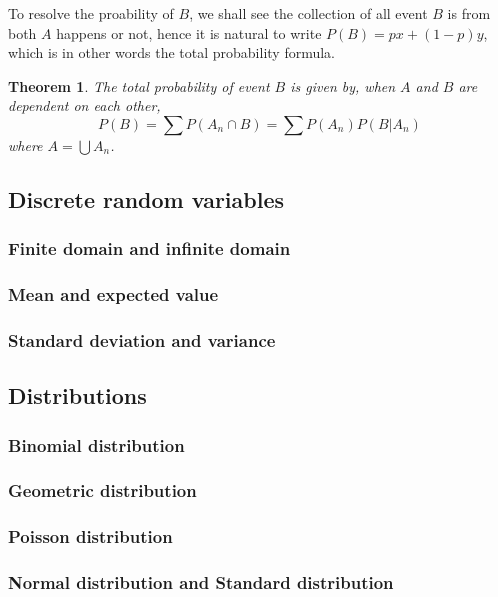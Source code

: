 \documentclass[12pt]{article}
\newtheorem*{theorem}{Theorem}
\begin{document}
    To resolve the proability of $B$, we shall see the collection of all event $B$ is from both $A$ happens or not, hence it is natural to write $P(B)=px+(1-p)y$, which is in other words the total probability formula.

    \begin{theorem}
        The total probability of event $B$ is given by, when $A$ and $B$ are dependent on each other, \[P(B)=\sum P(A_n\cap B)=\sum P(A_n)P(B|A_n)\] where $A=\bigcup A_n$.
    \end{theorem}

    \subsection{Discrete random variables}

    \subsubsection*{Finite domain and infinite domain}

    \subsubsection*{Mean and expected value}

    \subsubsection*{Standard deviation and variance}

    \subsection{Distributions}

    \subsubsection*{Binomial distribution}

    \subsubsection*{Geometric distribution}

    \subsubsection*{Poisson distribution}

    \subsubsection*{Normal distribution and Standard distribution}
\end{document}
